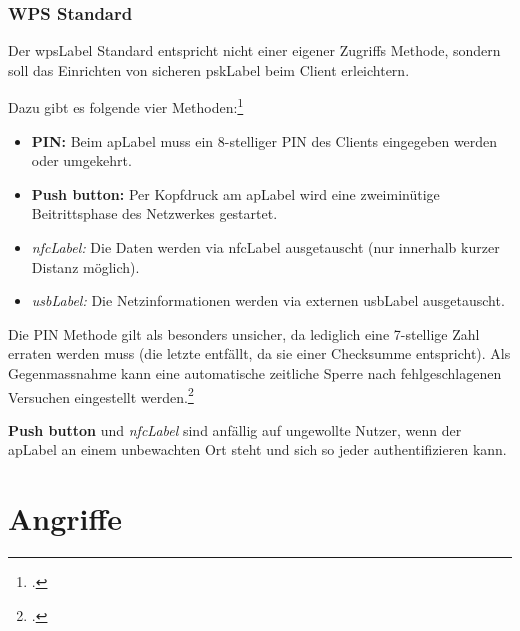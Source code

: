 \subsubsection{WPS Standard}
Der \gls{wpsLabel} Standard entspricht nicht einer eigener Zugriffs Methode, sondern soll das Einrichten von sicheren \gls{pskLabel} beim Client erleichtern.

Dazu gibt es folgende vier Methoden:\footcite{Wi-Fi_Protected_Setup_-_Wikipedia_the_free_encyclopedia_2015-04-10}
\begin{itemize}
	\item \textbf{PIN:} Beim \gls{apLabel} muss ein 8-stelliger PIN des Clients eingegeben werden oder umgekehrt.
	\item \textbf{Push button:} Per Kopfdruck am \gls{apLabel} wird eine zweiminütige Beitrittsphase des Netzwerkes gestartet.
	\item \textit{\gls{nfcLabel}:} Die Daten werden via \gls{nfcLabel} ausgetauscht (nur innerhalb kurzer Distanz möglich).
	\item \textit{\gls{usbLabel}:} Die Netzinformationen werden via externen \gls{usbLabel} ausgetauscht.
\end{itemize}

Die PIN Methode gilt als besonders unsicher, da lediglich eine 7-stellige Zahl erraten werden muss (die letzte entfällt, da sie einer Checksumme entspricht).
Als Gegenmassnahme kann eine automatische zeitliche Sperre nach fehlgeschlagenen Versuchen eingestellt werden.\footcite{viehboeck_wps_2015-04-10}

\textbf{Push button} und \textit{\gls{nfcLabel}} sind anfällig auf ungewollte Nutzer, wenn der \gls{apLabel} an einem unbewachten Ort steht und sich so jeder authentifizieren kann.



\section{Angriffe}

